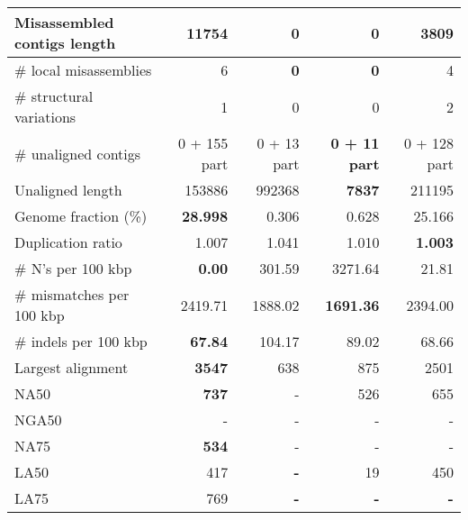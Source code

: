 \documentclass[12pt,a4paper]{article}
\begin{document}
\begin{table}[ht]
\begin{center}
\begin{tabular}{|l*{4}{|r}|}
Misassembled contigs length & 11754 & {\bf 0} & {\bf 0} & 3809 \\ \hline
\# local misassemblies & 6 & {\bf 0} & {\bf 0} & 4 \\ \hline
\# structural variations & 1 & 0 & 0 & 2 \\ \hline
\# unaligned contigs & 0 + 155 part & 0 + 13 part & {\bf 0 + 11 part} & 0 + 128 part \\ \hline
Unaligned length & 153886 & 992368 & {\bf 7837} & 211195 \\ \hline
Genome fraction (\%) & {\bf 28.998} & 0.306 & 0.628 & 25.166 \\ \hline
Duplication ratio & 1.007 & 1.041 & 1.010 & {\bf 1.003} \\ \hline
\# N's per 100 kbp & {\bf 0.00} & 301.59 & 3271.64 & 21.81 \\ \hline
\# mismatches per 100 kbp & 2419.71 & 1888.02 & {\bf 1691.36} & 2394.00 \\ \hline
\# indels per 100 kbp & {\bf 67.84} & 104.17 & 89.02 & 68.66 \\ \hline
Largest alignment & {\bf 3547} & 638 & 875 & 2501 \\ \hline
NA50 & {\bf 737} & - & 526 & 655 \\ \hline
NGA50 & - & - & - & - \\ \hline
NA75 & {\bf 534} & - & - & - \\ \hline
LA50 & 417 & {\bf -} & 19 & 450 \\ \hline
LA75 & 769 & {\bf -} & {\bf -} & {\bf -} \\ \hline
\end{tabular}
\end{center}
\end{table}
\end{document}
